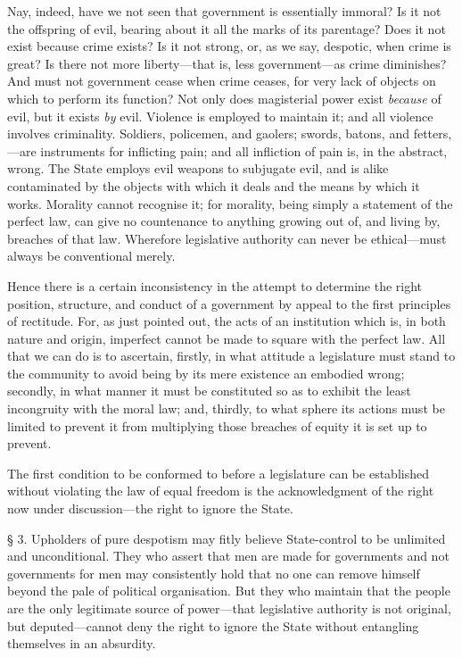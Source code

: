 \documentclass[oneside]{book}
\begin{document}
Nay, indeed, have we not seen that government is essentially
immoral? Is it not the offspring of evil, bearing about it all
the marks of its parentage? Does it not exist because crime
exists? Is it not strong, or, as we say, despotic, when crime is
great? Is there not more liberty---that is, less government---as
crime diminishes? And must not government cease when crime
ceases, for very lack of objects on which to perform its function?
Not only does magisterial power exist \textit{because} of evil, but it
exists \textit{by} evil. Violence is employed to maintain it; and all
violence involves criminality. Soldiers, policemen, and gaolers;
swords, batons, and fetters,---are instruments for inflicting pain;
and all infliction of pain is, in the abstract, wrong. The State
employs evil weapons to subjugate evil, and is alike contaminated
by the objects with which it deals and the means by which it
works. Morality cannot recognise it; for morality, being simply
a statement of the perfect law, can give no countenance to anything
growing out of, and living by, breaches of that law.
Wherefore legislative authority can never be ethical---must
always be conventional merely.

Hence there is a certain inconsistency in the attempt to
determine the right position, structure, and conduct of a government
by appeal to the first principles of rectitude. For, as just
pointed out, the acts of an institution which is, in both nature
and origin, imperfect cannot be made to square with the perfect
law. All that we can do is to ascertain, firstly, in what attitude
\newpage\noindent
a legislature must stand to the community to avoid being by its
mere existence an embodied wrong; secondly, in what manner it
must be constituted so as to exhibit the least incongruity with
the moral law; and, thirdly, to what sphere its actions must be
limited to prevent it from multiplying those breaches of equity it
is set up to prevent.

The first condition to be conformed to before a legislature
can be established without violating the law of equal freedom is
the acknowledgment of the right now under discussion---the
right to ignore the State.


\S{} 3. Upholders of pure despotism may fitly believe State-control
to be unlimited and unconditional. They who assert
that men are made for governments and not governments for
men may consistently hold that no one can remove himself
beyond the pale of political organisation. But they who
maintain that the people are the only legitimate source of power---that
legislative authority is not original, but deputed---cannot
deny the right to ignore the State without entangling themselves
in an absurdity.
\end{document}

